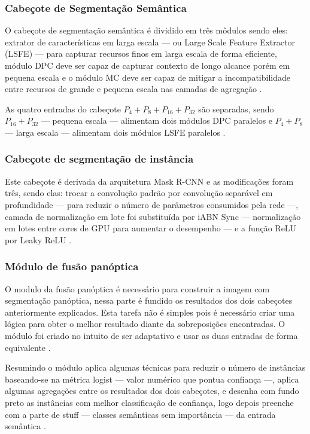 \subsubsection*{Cabeçote de Segmentação Semântica}

O cabeçote de segmentação semântica é dividido em três môdulos sendo eles: extrator de características em larga escala — ou Large Scale Feature Extractor (LSFE) — para capturar recursos finos em larga escala de forma eficiente, módulo DPC deve ser capaz de capturar contexto de longo alcance porém em pequena escala e o módulo MC deve ser capaz de mitigar a incompatibilidade entre recursos de grande e pequena escala nas camadas de agregação \cite{mohan2020efficientps}.

As quatro entradas do cabeçote $ P_4 + P_8 + P_{16} + P_{32} $ são separadas, sendo $ P_{16} + P_{32} $ — pequena escala — alimentam dois módulos DPC paralelos e $ P_4 + P_8 $ — larga escala — alimentam dois módulos LSFE paralelos \cite{mohan2020efficientps}.

\subsubsection*{Cabeçote de segmentação de instância}

Este cabeçote é derivada da arquitetura Mask R-CNN e as modificações foram três, sendo elas: trocar a convolução padrão por convolução separável em profundidade — para reduzir o número de parâmetros consumidos pela rede —, camada de normalização em lote foi substituída por iABN Sync — normalização em lotes entre cores de GPU para aumentar o desempenho — e a função ReLU por Leaky ReLU \cite{mohan2020efficientps,redes-neurais-convolucionais-separaveis-em-profundidade, serp-ai}.
	

\subsubsection*{Módulo de fusão panóptica}

O modulo da fusão panóptica é necessário para construir a imagem com segmentação panóptica, nessa parte é fundido os resultados dos dois cabeçotes anteriormente explicados. Esta tarefa não é simples pois é necessário criar uma lógica para obter o melhor resultado diante da sobreposições encontradas. O módulo foi criado no intuito de ser adaptativo e usar as duas entradas de forma equivalente \cite{mohan2020efficientps}.

Resumindo o módulo aplica algumas técnicas para reduzir o número de instâncias baseando-se na métrica logist — valor numérico que pontua confiança —, aplica algumas agregações entre os resultados dos dois cabeçotes, e desenha com fundo preto as instâncias com melhor classificação de confiança, logo depois preenche com a parte de stuff — classes semânticas sem importância — da entrada semântica \cite{mohan2020efficientps}.